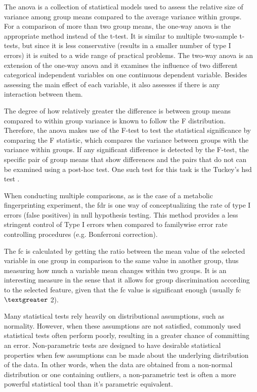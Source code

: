 The \gls{anova} is a collection of statistical models used to assess the relative size of variance among group means compared to the average variance within groups. For a comparison of more than two group means, the one-way \gls{anova} is the appropriate method instead of the t-test. It is similar to multiple two-sample t-tests, but since it is less conservative (results in a smaller number of type I errors) it is suited to a wide range of practical problems. The two-way \gls{anova} is an extension of the one-way \gls{anova} and it examines the influence of two different categorical independent variables on one continuous dependent variable. Besides assessing the main effect of each variable, it also assesses if there is any interaction between them.

The degree of how relatively greater the difference is between group means compared to within group variance is known to follow the F distribution. Therefore, the \gls{anova}  makes use of the F-test to test the statistical significance by comparing the F statistic, which compares the variance between groups with the variance within groups. If any significant difference is detected by the F-test, the specific pair of group means that show differences and the pairs that do not can be examined using a post-hoc test. One such test for this task is the Tuckey's \gls{hsd} test \citep{kim2014analysis}.

When conducting multiple comparisons, as is the case of a metabolic fingerprinting experiment, the \gls{fdr} is one way of conceptualizing the rate of type I errors (false positives) in null hypothesis testing. This method provides a less stringent control of Type I errors when compared to familywise error rate controlling procedures (e.g. Bonferroni correction).

The \gls{fc} is calculated by getting the ratio between the mean value of the selected variable in one group in comparison to the same value in another group, thus measuring how much a variable mean changes within two groups. It is an interesting measure in the sense that it allows for group discrimination according to the selected feature, given that the \gls{fc} value is significant enough (usually \gls{fc} $ \textgreater $ 2).

Many statistical tests rely heavily on distributional assumptions, such as normality. However, when these assumptions are not satisfied, commonly used statistical tests often perform poorly, resulting in a greater chance of committing an error. Non-parametric tests are designed to have desirable statistical properties when few assumptions can be made about the underlying distribution of the data. In other words, when the data are obtained from a non-normal distribution or one containing outliers, a non-parametric test is often a more powerful statistical tool than it's parametric equivalent.

